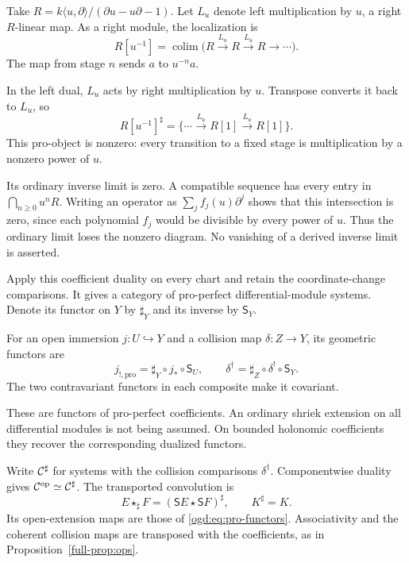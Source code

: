 \begin{example}\label{ogd:ex:pro-localization}
Take $R=k\langle u,\partial\rangle/(\partial u-u\partial-1)$.
Let $L_u$ denote left multiplication by $u$, a right $R$-linear map.
As a right module, the localization is
\[
 R[u^{-1}]=\operatorname{colim}
   \bigl(R\xrightarrow{L_u}R\xrightarrow{L_u}R\longrightarrow\cdots\bigr).
\]
The map from stage $n$ sends $a$ to $u^{-n}a$.

In the left dual, $L_u$ acts by right multiplication by $u$.
Transpose converts it back to $L_u$, so
\[
 R[u^{-1}]^\sharp
 =\{\cdots\xrightarrow{L_u}R[1]\xrightarrow{L_u}R[1]\}.
\]
This pro-object is nonzero: every transition to a fixed stage
is multiplication by a nonzero power of $u$.

Its ordinary inverse limit is zero.
A compatible sequence has every entry in $\bigcap_{n\geq0}u^nR$.
Writing an operator as $\sum_j f_j(u)\partial^j$ shows that this
intersection is zero, since each polynomial $f_j$ would be divisible
by every power of $u$.
Thus the ordinary limit loses the nonzero diagram.
No vanishing of a derived inverse limit is asserted.
\end{example}

Apply this coefficient duality on every chart and retain the
coordinate-change comparisons. It gives a category of pro-perfect
differential-module systems. Denote its functor on $Y$ by $\sharp_Y$
and its inverse by $\mathsf S_Y$.

For an open immersion $j:U\hookrightarrow Y$
and a collision map $\delta:Z\to Y$, its geometric functors are
\begin{equation}\label{ogd:eq:pro-functors}
 j_{!,\mathrm{pro}}=\sharp_Y\circ j_*\circ\mathsf S_U,
 \qquad
 \delta^\dagger=\sharp_Z\circ\delta^!\circ\mathsf S_Y.
\end{equation}
The two contravariant functors in each composite make it covariant.

These are functors of pro-perfect coefficients.
An ordinary shriek extension on all differential modules is not
being assumed. On bounded holonomic coefficients they recover
the corresponding dualized functors.

Write\label{ogd:def:pro-perfect-collision-category} $\mathcal C^\sharp$ for systems with the collision comparisons
$\delta^\dagger$. Componentwise duality gives
$\mathcal C^{\mathrm{op}}\simeq\mathcal C^\sharp$.
The transported convolution is
\begin{equation}\label{ogd:eq:pro-convolution}
 E\star_\sharp F=(\mathsf S E\star\mathsf S F)^\sharp,
 \qquad K^\sharp=K.
\end{equation}
Its open-extension maps are those of \eqref{ogd:eq:pro-functors}.
Associativity and the coherent collision maps are transposed with
the coefficients, as in Proposition~\ref{full-prop:ops}.

